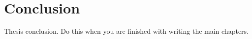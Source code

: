 \chapter*{Conclusion}
{}

Thesis conclusion. Do this when you are finished with writing the main chapters.
